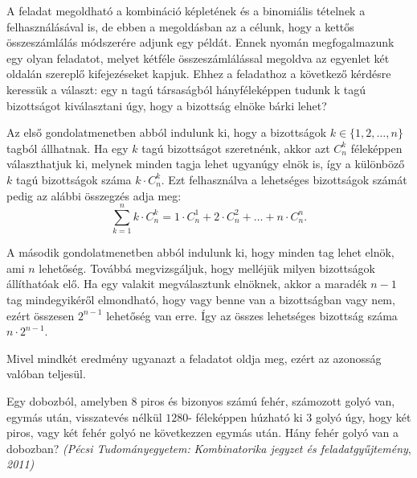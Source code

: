 \begin{solution}
A feladat megoldható a kombináció képletének és a binomiális tételnek
a felhasználásával is, de ebben a megoldásban az a célunk, hogy a
kettős összeszámlálás módszerére adjunk egy példát. Ennek nyomán megfogalmazunk
egy olyan feladatot, melyet kétféle összeszámlálással megoldva az
egyenlet két oldalán szereplő kifejezéseket kapjuk. Ehhez a feladathoz
a következő kérdésre keressük a választ: egy n tagú társaságból hányféleképpen
tudunk k tagú bizottságot kiválasztani úgy, hogy a bizottság elnöke
bárki lehet?

Az első gondolatmenetben abból indulunk ki, hogy a bizottságok $k\in\{1,2,\dots,n\}$
tagból állhatnak. Ha egy $k$ tagú bizottságot szeretnénk, akkor azt
$C_{n}^{k}$ féleképpen választhatjuk ki, melynek minden tagja lehet
ugyanúgy elnök is, így a különböző $k$ tagú bizottságok száma $k\cdot C_{n}^{k}$.
Ezt felhasználva a lehetséges bizottságok számát pedig az alábbi összegzés
adja meg: 
\[
\sum\limits_{k=1}^{n}k\cdot C_{n}^{k}=1\cdot C_{n}^{1}+2\cdot C_{n}^{2}+\dots+n\cdot C_{n}^{n}.
\]

A második gondolatmenetben abból indulunk ki, hogy minden tag lehet
elnök, ami $n$ lehetőség. Továbbá megvizsgáljuk, hogy melléjük milyen
bizottságok állíthatóak elő. Ha egy valakit megválasztunk elnöknek,
akkor a maradék $n-1$ tag mindegyikéről elmondható, hogy vagy benne
van a bizottságban vagy nem, ezért összesen $2^{n-1}$ lehetőség van
erre. Így az összes lehetséges bizottság száma $n\cdot2^{n-1}$.

Mivel mindkét eredmény ugyanazt a feladatot oldja meg, ezért az azonosság
valóban teljesül. 
\end{solution}
\begin{extraproblem}
Egy dobozból, amelyben $8$ piros és bizonyos számú fehér, számozott
golyó van, egymás után, visszatevés nélkül $1280$- féleképpen húzható
ki $3$ golyó úgy, hogy két piros, vagy két fehér golyó ne következzen
egymás után. Hány fehér golyó van a dobozban? \emph{(Pécsi Tudományegyetem:
}\textit{Kombinatorika jegyzet és feladatgyűjtemény},\emph{ 2011) }
\end{extraproblem}

